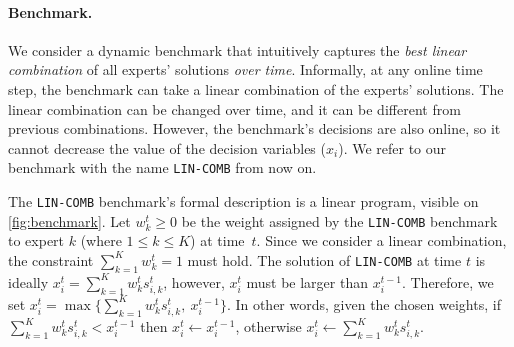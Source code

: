 \paragraph{Benchmark.}
We consider a dynamic benchmark that intuitively captures the \emph{best linear combination} of all experts' solutions \emph{over time}.
Informally, at any online time step, the benchmark can take a linear combination of the experts' solutions.
The linear combination can be changed over time, and it can be different from previous combinations.
However, the benchmark's decisions are also online, so it cannot decrease the value of the decision variables ($x_{i}$).
We refer to our benchmark with the name \texttt{LIN-COMB} from now on.

The \texttt{LIN-COMB} benchmark's formal description is a linear program, visible on \cref{fig:benchmark}.
Let $w_{k}^{t} \geq 0$ be the weight assigned by the \texttt{LIN-COMB} benchmark to expert $k$ (where $1 \leq k \leq K$) at time~$t$.
Since we consider a linear combination, the constraint $ \sum_{k=1}^{K} w_{k}^{t} = 1$ must hold.
The solution of \texttt{LIN-COMB} at time $t$ is ideally $x_{i}^{t} = \sum_{k=1}^{K} w_{k}^{t} s_{i,k}^{t}$,
however, $x_{i}^{t}$ must be larger than $x_{i}^{t-1}$.
Therefore, we set $x_{i}^{t} = \max\bigl\{\sum_{k=1}^{K} w_{k}^{t} s_{i,k}^{t},\ x_{i}^{t-1}\bigr\}$.
In other words, given the chosen weights, if  $\sum_{k=1}^{K} w_{k}^{t} s_{i,k}^{t} < x_{i}^{t-1}$ then $x_{i}^{t} \gets x_{i}^{t-1}$,
otherwise $x_{i}^{t} \gets \sum_{k=1}^{K} w_{k}^{t} s_{i,k}^{t}$.

